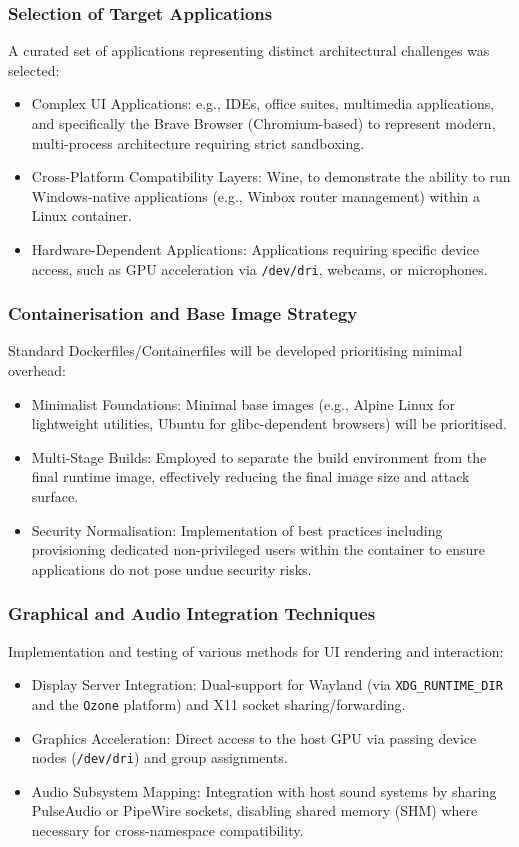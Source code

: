 \documentclass[journal,onecolumn]{IEEEtran}
\newcommand{\code}[1]{\texttt{#1}}
\begin{document}
\subsubsection{Selection of Target Applications}
A curated set of applications representing distinct architectural challenges was selected:
\begin{itemize}
    \item Complex UI Applications: e.g., IDEs, office suites, multimedia applications, and specifically the Brave Browser (Chromium-based) to represent modern, multi-process architecture requiring strict sandboxing.
    \item Cross-Platform Compatibility Layers: Wine, to demonstrate the ability to run Windows-native applications (e.g., Winbox router management) within a Linux container.
    \item Hardware-Dependent Applications: Applications requiring specific device access, such as GPU acceleration via \texttt{/dev/dri}, webcams, or microphones.
\end{itemize}

\subsubsection{Containerisation and Base Image Strategy}
Standard Dockerfiles/Containerfiles will be developed prioritising minimal overhead:
\begin{itemize}
    \item Minimalist Foundations: Minimal base images (e.g., Alpine Linux for lightweight utilities, Ubuntu for glibc-dependent browsers) will be prioritised.
    \item Multi-Stage Builds: Employed to separate the build environment from the final runtime image, effectively reducing the final image size and attack surface.
    \item Security Normalisation: Implementation of best practices including provisioning dedicated non-privileged users within the container to ensure applications do not pose undue security risks.
\end{itemize}

\subsubsection{Graphical and Audio Integration Techniques}
Implementation and testing of various methods for UI rendering and interaction:
\begin{itemize}
    \item Display Server Integration: Dual-support for Wayland (via \code{XDG\_RUNTIME\_DIR} and the \code{Ozone} platform) and X11 socket sharing/forwarding.
    \item Graphics Acceleration: Direct access to the host GPU via passing device nodes (\code{/dev/dri}) and group assignments.
    \item Audio Subsystem Mapping: Integration with host sound systems by sharing PulseAudio or PipeWire sockets, disabling shared memory (SHM) where necessary for cross-namespace compatibility.
\end{itemize}
\end{document}
